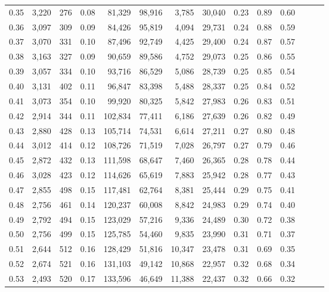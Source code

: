 \begin{tabular}{rrrrrrrrrrrrrr}
0.35 &  3,220 &  276 &  0.08 &   81,329 &   98,916 &   3,785 &  30,040 &  0.23 &  0.89 &      0.60 \\
0.36 &  3,097 &  309 &  0.09 &   84,426 &   95,819 &   4,094 &  29,731 &  0.24 &  0.88 &      0.59 \\
0.37 &  3,070 &  331 &  0.10 &   87,496 &   92,749 &   4,425 &  29,400 &  0.24 &  0.87 &      0.57 \\
0.38 &  3,163 &  327 &  0.09 &   90,659 &   89,586 &   4,752 &  29,073 &  0.25 &  0.86 &      0.55 \\
0.39 &  3,057 &  334 &  0.10 &   93,716 &   86,529 &   5,086 &  28,739 &  0.25 &  0.85 &      0.54 \\
0.40 &  3,131 &  402 &  0.11 &   96,847 &   83,398 &   5,488 &  28,337 &  0.25 &  0.84 &      0.52 \\
0.41 &  3,073 &  354 &  0.10 &   99,920 &   80,325 &   5,842 &  27,983 &  0.26 &  0.83 &      0.51 \\
0.42 &  2,914 &  344 &  0.11 &  102,834 &   77,411 &   6,186 &  27,639 &  0.26 &  0.82 &      0.49 \\
0.43 &  2,880 &  428 &  0.13 &  105,714 &   74,531 &   6,614 &  27,211 &  0.27 &  0.80 &      0.48 \\
0.44 &  3,012 &  414 &  0.12 &  108,726 &   71,519 &   7,028 &  26,797 &  0.27 &  0.79 &      0.46 \\
0.45 &  2,872 &  432 &  0.13 &  111,598 &   68,647 &   7,460 &  26,365 &  0.28 &  0.78 &      0.44 \\
0.46 &  3,028 &  423 &  0.12 &  114,626 &   65,619 &   7,883 &  25,942 &  0.28 &  0.77 &      0.43 \\
0.47 &  2,855 &  498 &  0.15 &  117,481 &   62,764 &   8,381 &  25,444 &  0.29 &  0.75 &      0.41 \\
0.48 &  2,756 &  461 &  0.14 &  120,237 &   60,008 &   8,842 &  24,983 &  0.29 &  0.74 &      0.40 \\
0.49 &  2,792 &  494 &  0.15 &  123,029 &   57,216 &   9,336 &  24,489 &  0.30 &  0.72 &      0.38 \\
0.50 &  2,756 &  499 &  0.15 &  125,785 &   54,460 &   9,835 &  23,990 &  0.31 &  0.71 &      0.37 \\
0.51 &  2,644 &  512 &  0.16 &  128,429 &   51,816 &  10,347 &  23,478 &  0.31 &  0.69 &      0.35 \\
0.52 &  2,674 &  521 &  0.16 &  131,103 &   49,142 &  10,868 &  22,957 &  0.32 &  0.68 &      0.34 \\
0.53 &  2,493 &  520 &  0.17 &  133,596 &   46,649 &  11,388 &  22,437 &  0.32 &  0.66 &      0.32 \\

\end{tabular}
